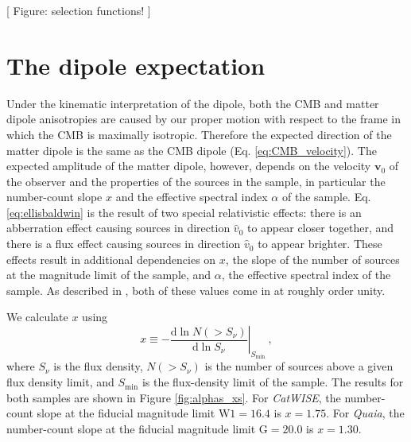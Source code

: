 \documentclass[modern]{aastex631}
\newcommand{\catwise}{\textsl{CatWISE}\xspace}
\newcommand{\quaia}{\textsl{Quaia}\xspace}
\newcommand{\vobs}{\boldsymbol{v}_0}
\newcommand{\dd}{\mathrm{d}}
\newcommand{\w}{\mathrm{W}}
\newcommand{\g}{\mathrm{G}}
\begin{document}
[ Figure: selection functions! ]


\section{The dipole expectation}
\label{sec:dipole_expectation}
Under the kinematic interpretation of the dipole, both the CMB and matter dipole anisotropies are caused by our proper motion with respect to the frame in which the CMB is maximally isotropic.
Therefore the expected direction of the matter dipole is the same as the CMB dipole (Eq. \ref{eq:CMB_velocity}).
The expected amplitude of the matter dipole, however, depends on the velocity $\vobs$ of the observer and the properties of the sources in the sample, in particular the number-count slope $x$ and the effective spectral index $\alpha$ of the sample.
Eq. \ref{eq:ellisbaldwin} is the result of two special relativistic effects: there is an abberration effect causing sources in direction $\hat{v}_0$ to appear closer together, and there is a flux effect causing sources in direction $\hat{v}_0$ to appear brighter.
These effects result in additional dependencies on $x$, the slope of the number of sources at the magnitude limit of the sample, and $\alpha$, the effective spectral index of the sample.
As described in \citet{ellis_expected_1984}, both of these values come in at roughly order unity.

We calculate $x$ using
\begin{equation}
    x \equiv -\left.\frac{\dd\ln N(>S_\nu)}{\dd\ln S_\nu}\right|_{S_\mathrm{min}} ~,
\end{equation}
where $S_\nu$ is the flux density, $N(>S_\nu)$ is the number of sources above a given flux density limit, and $S_\mathrm{min}$ is the flux-density limit of the sample.
The results for both samples are shown in Figure \ref{fig:alphas_xs}.
For \catwise, the number-count slope at the fiducial magnitude limit $\w 1=16.4$ is $x=1.75$.
For \quaia, the number-count slope at the fiducial magnitude limit $\g =20.0$ is $x=1.30$.
\end{document}
